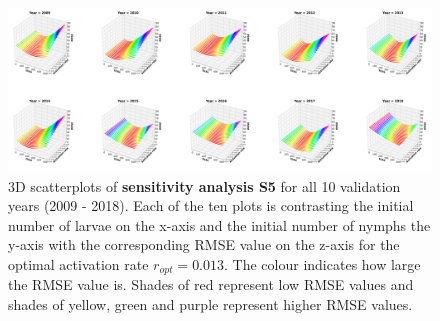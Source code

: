 \documentclass[a4paper, 11pt]{scrartcl}
\begin{document}
\begin{figure}
\centering
\includegraphics[width=\linewidth]{figures/S5_2009_2018_rmse}
\caption{3D scatterplots of \textbf{sensitivity analysis S5} for all 10 validation years (2009 - 2018). Each of the ten plots is contrasting the initial number of larvae on the x-axis and the initial number of nymphs the y-axis with the corresponding RMSE value on the z-axis for the optimal activation rate $r_{opt} = 0.013$. The colour indicates how large the RMSE value is. Shades of red represent low RMSE values and shades of yellow, green and purple represent higher RMSE values.}
\label{fig:S5_2009_2018_rmse_rotated}
\end{figure}
\end{document}
